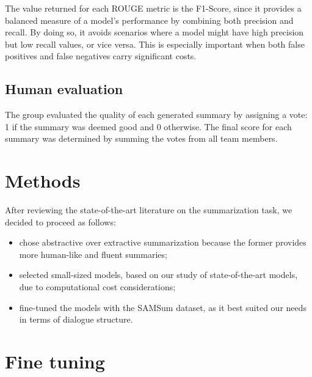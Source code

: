 \documentclass[10pt,twocolumn,letterpaper]{article}
\begin{document}
The value returned for each ROUGE metric is the F1-Score, since it provides a balanced measure of a model's performance by combining both precision and recall. By doing so, it avoids scenarios where a model might have high precision but low recall values, or vice versa. This is especially important when both false positives and false negatives carry significant costs.

\subsection{Human evaluation}
The group evaluated the quality of each generated summary by assigning a vote: 1 if the summary was deemed good and 0 otherwise. The final score for each summary was determined by summing the votes from all team members.

\section{Methods}
After reviewing the state-of-the-art literature on the summarization task, we decided to proceed as follows:
\begin{itemize}
    \item chose abstractive over extractive summarization because the former provides more human-like and fluent summaries;
    \item selected small-sized models, based on our study of state-of-the-art models, due to computational cost considerations;
    \item fine-tuned the models with the SAMSum dataset, as it best suited our needs in terms of dialogue structure.
\end{itemize}

\section{Fine tuning}
\end{document}
